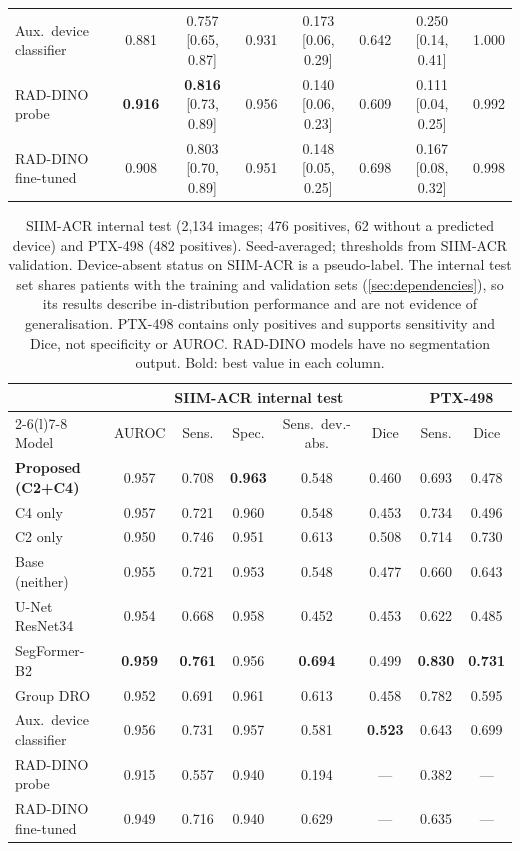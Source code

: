 \documentclass{ieeeaccess}
\newcommand{\ci}[2]{\scriptsize[#1, #2]}
\begin{document}
\begin{table}[!t]
\begin{tabular}{@{}l c c c c c c c@{}}
Aux.\ device classifier & 0.881 & 0.757 \ci{0.65}{0.87} & 0.931 & 0.173 \ci{0.06}{0.29} & 0.642 & 0.250 \ci{0.14}{0.41} & 1.000 \\
RAD-DINO probe & \textbf{0.916} & \textbf{0.816} \ci{0.73}{0.89} & 0.956 & 0.140 \ci{0.06}{0.23} & 0.609 & 0.111 \ci{0.04}{0.25} & 0.992 \\
RAD-DINO fine-tuned & 0.908 & 0.803 \ci{0.70}{0.89} & 0.951 & 0.148 \ci{0.05}{0.25} & 0.698 & 0.167 \ci{0.08}{0.32} & 0.998 \\
\bottomrule
\end{tabular}
\end{table}

\begin{table}[!t]
\centering\small
\setlength{\tabcolsep}{4.5pt}
\caption{SIIM-ACR internal test (2{,}134 images; 476 positives, 62 without a predicted device) and PTX-498 (482 positives). Seed-averaged; thresholds from SIIM-ACR validation. Device-absent status on SIIM-ACR is a pseudo-label. The internal test set shares patients with the training and validation sets (\cref{sec:dependencies}), so its results describe in-distribution performance and are not evidence of generalisation. PTX-498 contains only positives and supports sensitivity and Dice, not specificity or AUROC. RAD-DINO models have no segmentation output. Bold: best value in each column.}
\label{tab:secondary}
\begin{tabular}{@{}l c c c c c c c@{}}
\toprule
 & \multicolumn{5}{c}{SIIM-ACR internal test} & \multicolumn{2}{c}{PTX-498} \\
\cmidrule(lr){2-6}\cmidrule(l){7-8}
Model & AUROC & Sens. & Spec. & Sens.\ dev.-abs. & Dice & Sens. & Dice \\
\midrule
\rowcolor{band}\textbf{Proposed (C2+C4)} & 0.957 & 0.708 & \textbf{0.963} & 0.548 & 0.460 & 0.693 & 0.478 \\
C4 only & 0.957 & 0.721 & 0.960 & 0.548 & 0.453 & 0.734 & 0.496 \\
C2 only & 0.950 & 0.746 & 0.951 & 0.613 & 0.508 & 0.714 & 0.730 \\
Base (neither) & 0.955 & 0.721 & 0.953 & 0.548 & 0.477 & 0.660 & 0.643 \\
\midrule
U-Net ResNet34 & 0.954 & 0.668 & 0.958 & 0.452 & 0.453 & 0.622 & 0.485 \\
SegFormer-B2 & \textbf{0.959} & \textbf{0.761} & 0.956 & \textbf{0.694} & 0.499 & \textbf{0.830} & \textbf{0.731} \\
Group DRO & 0.952 & 0.691 & 0.961 & 0.613 & 0.458 & 0.782 & 0.595 \\
Aux.\ device classifier & 0.956 & 0.731 & 0.957 & 0.581 & \textbf{0.523} & 0.643 & 0.699 \\
RAD-DINO probe & 0.915 & 0.557 & 0.940 & 0.194 & --- & 0.382 & --- \\
RAD-DINO fine-tuned & 0.949 & 0.716 & 0.940 & 0.629 & --- & 0.635 & --- \\
\bottomrule
\end{tabular}
\end{table}
\end{document}
